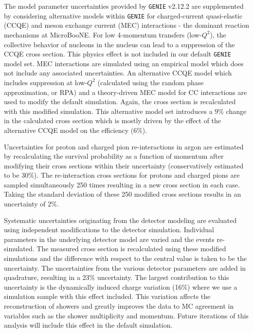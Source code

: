 \documentclass[%
 reprint,
 twocolumn,
superscriptaddress,
showpacs,preprintnumbers,
 amsmath,amssymb,
 aps,
prd,
longbibliography
]{revtex4-1}
\begin{document}
The model parameter uncertainties provided by \texttt{GENIE} v2.12.2 are supplemented by considering alternative models within \texttt{GENIE} for charged-current quasi-elastic (CCQE) and meson exchange current (MEC) interactions - the dominant reaction mechanisms at MicroBooNE.
For low 4-momentum transfers (low-$Q^{2}$), the collective behavior of nucleons in the nucleus can lead to a suppression of the CCQE cross section. This physics effect is not included in our default \texttt{GENIE} model set. MEC interactions are simulated using an empirical model which does not include any associated uncertainties. An alternative CCQE model which includes suppression at low-$Q^{2}$ (calculated using the random phase approximation, or RPA) and a theory-driven MEC model for CC interactions \cite{PhysRevC.70.055503,Valencia1,Valencia2} are used to modify the default simulation.  Again, the cross section is recalculated with this modified simulation. This alternative model set introduces a 9\% change in the calculated cross section which is mostly driven by the effect of the alternative CCQE model on the efficiency (6\%).

Uncertainties for proton and charged pion re-interactions in argon are estimated by recalculating the survival probability as a function of momentum after modifying their cross sections within their uncertainty (conservatively estimated to be 30\%). The re-interaction cross sections for protons and charged pions are sampled simultaneously 250 times resulting in a new cross section in each case. Taking the standard deviation of these 250 modified cross sections results in an uncertainty of 2\%.

Systematic uncertainties originating from the detector modeling are evaluated using independent modifications to the detector simulation. Individual parameters in the underlying detector model are varied and the events re-simulated.
The measured cross section is recalculated using these modified simulations and the difference with respect to the central value is taken to be the uncertainty.
The uncertainties from the various detector parameters are added in quadrature, resulting in a 23\% uncertainty. 
The largest contribution to this uncertainty is the dynamically induced charge variation (16\%) where we use a simulation sample with this effect included. This variation affects the reconstruction of showers and greatly improves the data to MC agreement in variables such as the shower multiplicity and momentum. Future iterations of this analysis will include this effect in the default simulation.
\end{document}

